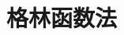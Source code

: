 \documentclass[UTF8]{report}
\theoremstyle{MyLineTheoremStyle} %
\theoremstyle{MyBlockTheoremStyle} %
\theoremstyle{MySubsubsectionStyle} %
\begin{document}
\chapter{格林函数法}\thispagestyle{fancy}
\end{document}
